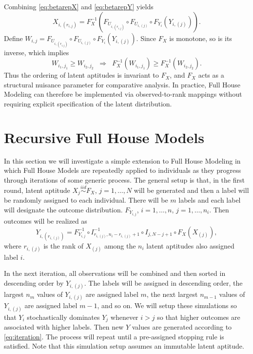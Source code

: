 \documentclass[12pt]{article}
\begin{document}
Combining \eqref{eq:betarepX} and \eqref{eq:betarepY} yields
$$
X_{i,(r_{i,j})} = F_X^{-1}\!\left(
F_{U_{i,(r_{i,j})}} \circ F_{U_{i,(j)}} \circ F_{Y_i}\!\left(Y_{i,(j)}\right)
\right).
$$
Define $W_{i,j} = F_{U_{i,(r_{i,j})}} \circ F_{U_{i,(j)}} \circ F_{Y_i}(Y_{i,(j)})$. Since $F_X$ is monotone, so is its inverse, which implies
$$
W_{i_1,j_1} \ge W_{i_2,j_2} \;\;\Longrightarrow\;\; 
F_X^{-1}(W_{i_1,j_1}) \ge F_X^{-1}(W_{i_2,j_2}).
$$
Thus the ordering of latent aptitudes is invariant to $F_X$, and $F_X$ acts as a structural nuisance parameter for comparative analysis. In practice, Full House Modeling can therefore be implemented via observed-to-rank mappings without requiring explicit specification of the latent distribution.


\section{Recursive Full House Models}
\label{sec:rFHMsetup}

In this section we will investigate a simple extension to Full House Modeling in which Full House Models are repeatedly applied to individuals as they progress through iterations of some generic process. The general setup is that, in the first round, latent aptitude $X_{j} \overset{iid}{\sim} F_X$, $j = 1,\ldots,N$ will be generated  and then a label will be randomly assigned to each individual. There will be $m$ labels and each label will designate the outcome distribution. $F_{Y_{i,j}}$, $i = 1,\ldots,n$, $j = 1,\ldots,n_i$. Then outcomes will be realized as
\begin{equation} \label{eq:iteration}
  Y_{i,(r_{i,(j)})} = F_{Y_{i,j}}^{-1} \circ I_{r_{i,(j)},n_i-r_{i,(j)}+1}^{-1} \circ I_{j,N-j+1} \circ  F_X (X_{(j)}),	
\end{equation}
where $r_{i,(j)}$ is the rank of $X_{(j)}$ among the $n_i$ latent aptitudes also assigned label $i$. 

In the next iteration, all observations will be combined and then sorted in descending order by $Y_{i,(j)}$. The labels will be assigned in descending order, the largest $n_m$ values of $Y_{i,(j)}$ are assigned label $m$, the next largest $n_{m-1}$ values of $Y_{i,(j)}$ are assigned label $m-1$, and so on. We will setup these simulations so that $Y_i$ stochastically dominates $Y_{j}$ whenever $i > j$ so that higher outcomes are associated with higher labels. Then new $Y$ values are generated according to \eqref{eq:iteration}. The process will repeat until a pre-assigned stopping rule is satisfied. Note that this simulation setup assumes an immutable latent aptitude.
\end{document}
